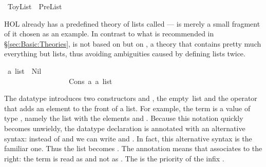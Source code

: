 %
\begin{isabellebody}%
\def\isabellecontext{ToyList}%
\ ToyList\ {\isacharequal}\ PreList{\isacharcolon}%
\begin{isamarkuptext}%
\noindent
HOL already has a predefined theory of lists called  ---
 is merely a small fragment of it chosen as an example. In
contrast to what is recommended in \S\ref{sec:Basic:Theories},
 is not based on  but on , a
theory that contains pretty much everything but lists, thus avoiding
ambiguities caused by defining lists twice.%
\end{isamarkuptext}%
\ {\isacharprime}a\ list\ {\isacharequal}\ Nil\ \ \ \ \ \ \ \ \ \ \ \ \ \ \ \ \ \ \ \ \ \ \ \ \ \ {\isacharparenleft}{\isachardoublequote}{\isacharbrackleft}{\isacharbrackright}{\isachardoublequote}{\isacharparenright}\isanewline
\ \ \ \ \ \ \ \ \ \ \ \ \ \ \ \ \ {\isacharbar}\ Cons\ {\isacharprime}a\ {\isachardoublequote}{\isacharprime}a\ list{\isachardoublequote}\ \ \ \ \ \ \ \ \ \ \ \ {\isacharparenleft}\ {\isachardoublequote}{\isacharhash}{\isachardoublequote}\ {}{}{\isacharparenright}%
\begin{isamarkuptext}%
\noindent
{}
The datatype  introduces two
constructors  and , the
empty~list and the operator that adds an element to the front of a list. For
example, the term  is a value of
type , namely the list with the elements  and
. Because this notation quickly becomes unwieldy, the
datatype declaration is annotated with an alternative syntax: instead of
 and  we can write
\isa{{\isacharbrackleft}{\isacharbrackright}} and
. In fact, this
alternative syntax is the familiar one.  Thus the list  becomes . The annotation
means that \isa{{\isacharhash}} associates to
the right: the term  is read as 
and not as .
The  is the priority of the infix \isa{{\isacharhash}}.


\end{isamarkuptext}
\end{isabellebody}
